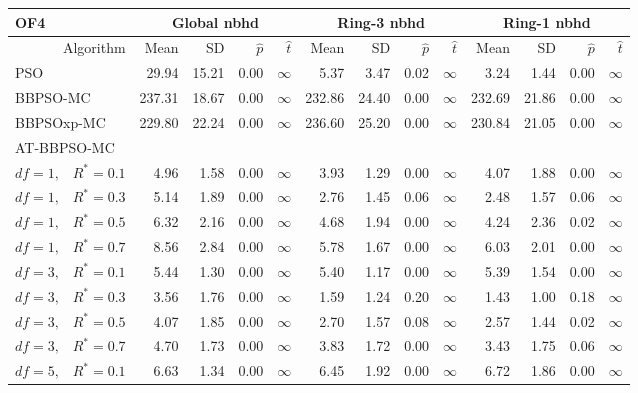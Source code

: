 \documentclass[12pt]{article}
\begin{document}
\begin{table}[ht]
\centering
\tiny{
\begin{tabular}{r|rrrr|rrrr|rrrr}
\multicolumn{1}{l}{OF4} & \multicolumn{4}{c}{Global nbhd} & \multicolumn{4}{c}{Ring-3 nbhd} & \multicolumn{4}{c}{Ring-1 nbhd}\\
  \hline
Algorithm & Mean & SD & $\widehat{p}$ & $\widehat{t}$ & Mean & SD & $\widehat{p}$ & $\widehat{t}$ & Mean & SD & $\widehat{p}$ & $\widehat{t}$ \\ 
  \hline
\multicolumn{1}{l|}{PSO} & 29.94 & 15.21 & 0.00 & $\infty$ & 5.37 & 3.47 & 0.02 & $\infty$ & 3.24 & 1.44 & 0.00 & $\infty$ \\ 
  \multicolumn{1}{l|}{BBPSO-MC} & 237.31 & 18.67 & 0.00 & $\infty$ & 232.86 & 24.40 & 0.00 & $\infty$ & 232.69 & 21.86 & 0.00 & $\infty$ \\ 
  \multicolumn{1}{l|}{BBPSOxp-MC} & 229.80 & 22.24 & 0.00 & $\infty$ & 236.60 & 25.20 & 0.00 & $\infty$ & 230.84 & 21.05 & 0.00 & $\infty$ \\ 
\hline
\multicolumn{1}{l|}{AT-BBPSO-MC} &&&&&&&&&&&&\\
  $df = 1,\enspace$ $R^* =0.1$ & 4.96 & 1.58 & 0.00 & $\infty$ & 3.93 & 1.29 & 0.00 & $\infty$ & 4.07 & 1.88 & 0.00 & $\infty$ \\ 
  $df = 1,\enspace$ $R^* =0.3$ & 5.14 & 1.89 & 0.00 & $\infty$ & 2.76 & 1.45 & 0.06 & $\infty$ & 2.48 & 1.57 & 0.06 & $\infty$ \\ 
  $df = 1,\enspace$ $R^* =0.5$ & 6.32 & 2.16 & 0.00 & $\infty$ & 4.68 & 1.94 & 0.00 & $\infty$ & 4.24 & 2.36 & 0.02 & $\infty$ \\ 
  $df = 1,\enspace$ $R^* =0.7$ & 8.56 & 2.84 & 0.00 & $\infty$ & 5.78 & 1.67 & 0.00 & $\infty$ & 6.03 & 2.01 & 0.00 & $\infty$ \\ 
  $df = 3,\enspace$ $R^* =0.1$ & 5.44 & 1.30 & 0.00 & $\infty$ & 5.40 & 1.17 & 0.00 & $\infty$ & 5.39 & 1.54 & 0.00 & $\infty$ \\ 
  $df = 3,\enspace$ $R^* =0.3$ & 3.56 & 1.76 & 0.00 & $\infty$ & 1.59 & 1.24 & 0.20 & $\infty$ & 1.43 & 1.00 & 0.18 & $\infty$ \\ 
  $df = 3,\enspace$ $R^* =0.5$ & 4.07 & 1.85 & 0.00 & $\infty$ & 2.70 & 1.57 & 0.08 & $\infty$ & 2.57 & 1.44 & 0.02 & $\infty$ \\ 
  $df = 3,\enspace$ $R^* =0.7$ & 4.70 & 1.73 & 0.00 & $\infty$ & 3.83 & 1.72 & 0.00 & $\infty$ & 3.43 & 1.75 & 0.06 & $\infty$ \\ 
  $df = 5,\enspace$ $R^* =0.1$ & 6.63 & 1.34 & 0.00 & $\infty$ & 6.45 & 1.92 & 0.00 & $\infty$ & 6.72 & 1.86 & 0.00 & $\infty$ \\ 

\end{tabular}}
\end{table}
\end{document}
